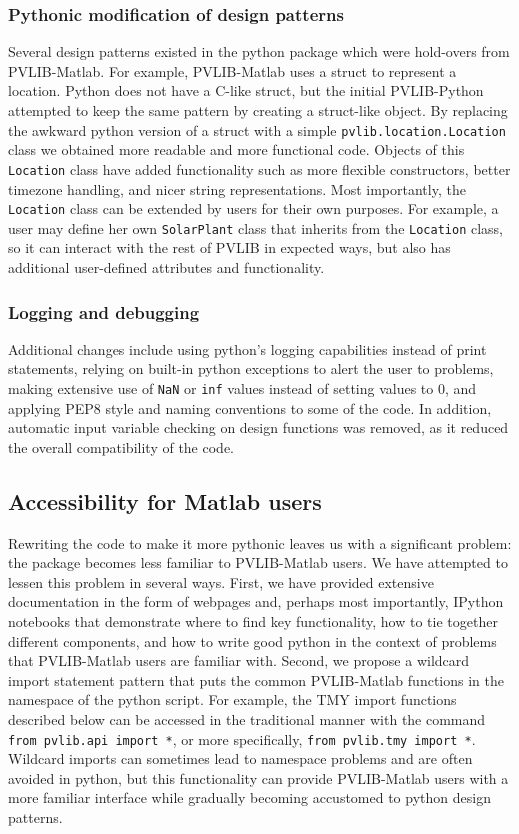 \documentclass[conference]{IEEEtran}
\begin{document}
\subsubsection{Pythonic modification of design patterns}
Several design patterns existed in the python package which were hold-overs from PVLIB-Matlab. 
For example, PVLIB-Matlab uses a struct to represent a location. 
Python does not have a C-like struct, but the initial PVLIB-Python attempted to keep the same pattern by creating a struct-like object.
By replacing the awkward python version of a struct with a simple \texttt{pvlib.location.Location} class we obtained more readable and more functional code.
Objects of this \texttt{Location} class have added functionality such as more flexible constructors, better timezone handling, and nicer string representations.
Most importantly, the \texttt{Location} class can be extended by users for their own purposes.
For example, a user may define her own \texttt{SolarPlant} class that inherits from the \texttt{Location} class, so it can interact with the rest of PVLIB in expected ways, but also has additional user-defined attributes and functionality.

\subsubsection{Logging and debugging}
Additional changes include using python's logging capabilities instead of print statements, relying on built-in python exceptions to alert the user to problems, making extensive use of \texttt{NaN} or \texttt{inf} values instead of setting values to 0, and applying PEP8 style and naming conventions \cite{pep8} to some of the code. In addition, automatic input variable checking on design functions was removed, as it reduced the overall compatibility of the code. 

\subsection{Accessibility for Matlab users}
Rewriting the code to make it more pythonic leaves us with a significant problem: the package becomes less familiar to PVLIB-Matlab users. 
We have attempted to lessen this problem in several ways.
First, we have provided extensive documentation in the form of webpages and, perhaps most importantly, IPython notebooks that demonstrate where to find key functionality, how to tie together different components, and how to write good python in the context of problems that PVLIB-Matlab users are familiar with.
Second, we propose a wildcard import statement pattern that puts the common PVLIB-Matlab functions in the namespace of the python script. 
For example, the TMY import functions described below can be accessed in the traditional manner with the command \texttt{from pvlib.api import *}, or more specifically, \texttt{from pvlib.tmy import *}. 
Wildcard imports can sometimes lead to namespace problems and are often avoided in python, but this functionality can provide PVLIB-Matlab users with a more familiar interface while gradually becoming accustomed to python design patterns.
\end{document}
